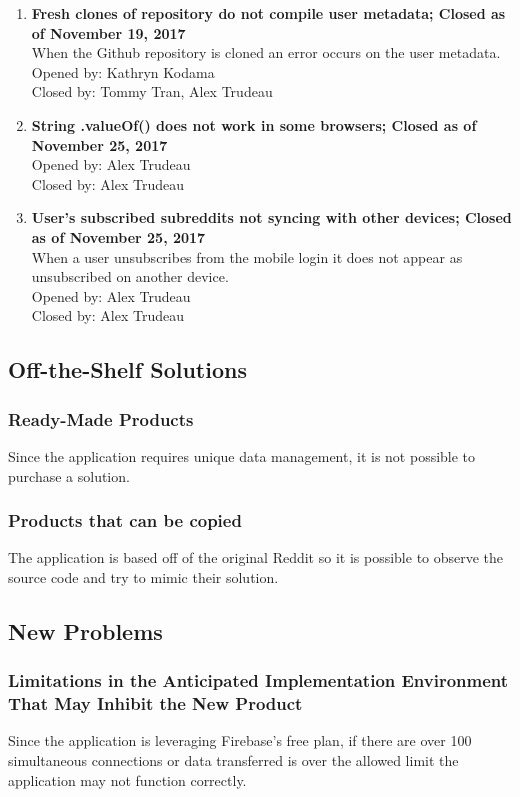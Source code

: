 \documentclass[12pt,fleqn]{article}
\begin{document}
\begin{enumerate}
\item \textbf{Fresh clones of repository do not compile user metadata; Closed as of November 19, 2017} \\
When the Github repository is cloned an error occurs on the user metadata. \\
Opened by: Kathryn Kodama \\
Closed by: Tommy Tran, Alex Trudeau \\

\item \textbf{String .valueOf() does not work in some browsers; Closed as of November 25, 2017} \\
Opened by: Alex Trudeau \\
Closed by: Alex Trudeau \\

\item \textbf{User's subscribed subreddits not syncing with other devices; Closed as of November 25, 2017} \\
When a user unsubscribes from the mobile login it does not appear as unsubscribed on another device. \\
Opened by: Alex Trudeau \\
Closed by: Alex Trudeau \\

\end{enumerate}

\subsection {Off-the-Shelf Solutions}

\subsubsection{Ready-Made Products}
Since the application requires unique data management, it is not possible to purchase a solution.
\subsubsection{Products that can be copied}
The application is based off of the original Reddit so it is possible to observe the source code and try to mimic their solution.

\subsection {New Problems}
\subsubsection {Limitations in the Anticipated Implementation
Environment That May Inhibit the New Product}
Since the application is leveraging Firebase's free plan, if there are over 100 simultaneous connections or data transferred is over the allowed limit the application may not function correctly.
\end{document}
